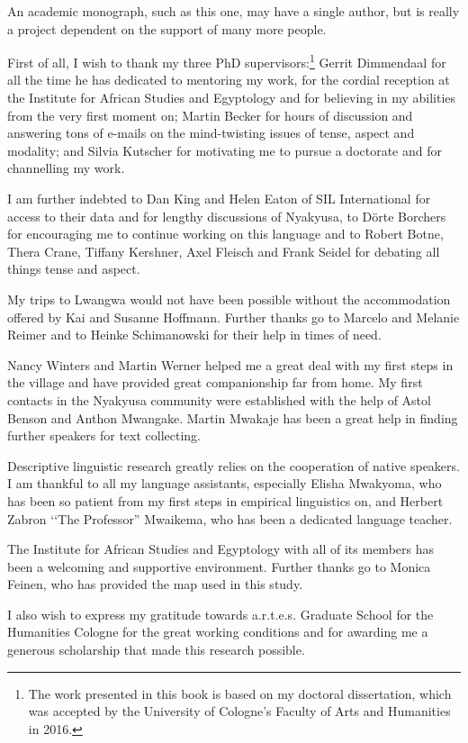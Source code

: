 An academic monograph, such as this one, may have a single author, but is really a project dependent on the support of many more people.

First of all, I wish to thank my three PhD supervisors:\footnote{The work presented in this book is based on my doctoral dissertation, which was accepted by the University of Cologne's Faculty of Arts and Humanities in 2016.} Gerrit Dimmendaal for all the time he has dedicated to mentoring my work, for the cordial reception at the Institute for African Studies and Egyptology and for believing in my abilities from the very first moment on; Martin Becker for hours of discussion and answering tons of e-mails on the mind-twisting issues of tense, aspect and modality; and Silvia Kutscher for motivating me to pursue a doctorate and for channelling my work.

I am further indebted to Dan King and Helen Eaton of SIL International for access to their data and for lengthy discussions of Nyakyusa, to Dörte Borchers for encouraging me to continue working on this language and to Robert Botne, Thera Crane, Tiffany Kershner, Axel Fleisch and Frank Seidel for debating all things tense and aspect.

My trips to Lwangwa would not have been possible without the accommodation offered by Kai and Susanne Hoffmann. Further thanks go to Marcelo and Melanie Reimer and to Heinke Schimanowski for their help in times of need.

Nancy Winters and Martin Werner helped me a great deal with my first steps in the village and have provided great companionship far from home. My first contacts in the Nyakyusa community were established with the help of Astol Benson and Anthon Mwangake. Martin Mwakaje has been a great help in finding further speakers for text collecting.

Descriptive linguistic research greatly relies on the cooperation of native speakers. I am thankful to all my language assistants, especially Elisha Mwakyoma, who has been so patient from my first steps in empirical linguistics on, and Herbert Zabron \lq\lq The Professor'' Mwaikema, who has been a dedicated language teacher.

\largerpage
The Institute for African Studies and Egyptology with all of its members has been a welcoming and supportive environment. Further thanks go to Monica Feinen, who has provided the map used in this study.

I also wish to express my gratitude towards a.r.t.e.s. Graduate School for the Humanities Cologne for the great working conditions and for awarding me a generous scholarship that made this research possible.

